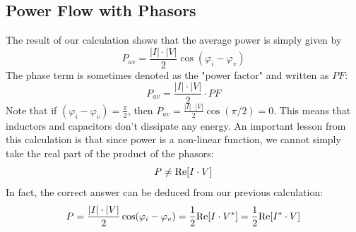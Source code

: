 \subsection{Power Flow with Phasors}
The result of our calculation shows that the average power is simply given by
    \begin{equation}
        {P_{av}} = \frac{{\left| I \right| \cdot \left| V \right|}}{2}\cos ({\varphi _i} - {\varphi _v})
    \end{equation}
The phase term is sometimes denoted as the "power factor" and written as $PF$:
    \begin{equation} 
        {P_{av}} = \frac{{\left| I \right| \cdot \left| V \right|}}{2} \cdot PF
    \end{equation}
Note that if $({\varphi _i} - {\varphi _v}) = \frac{\pi }{2}$, then ${P_{av}} = \frac{{\left| I \right| \cdot \left| V \right|}}{2}\cos (\pi /2) = 0$.  This means that inductors and capacitors don't dissipate any energy.
An important lesson from this calculation is that since power is a non-linear function, we cannot simply take the real part of the product of the phasors:
    \begin{equation}
        P \ne {\mathop{\rm Re}\nolimits} [I \cdot V]
    \end{equation}
In fact, the correct answer can be deduced from our previous calculation:
    \begin{equation}
        P = \frac{{\left| I \right| \cdot \left| V \right|}}{2}\cos ({\varphi _i} - {\varphi _v}) = \frac{1}{2}{\mathop{\rm Re}\nolimits} [I \cdot {V^*}] = \frac{1}{2}{\mathop{\rm Re}\nolimits} [{I^*} \cdot V]
    \end{equation}
